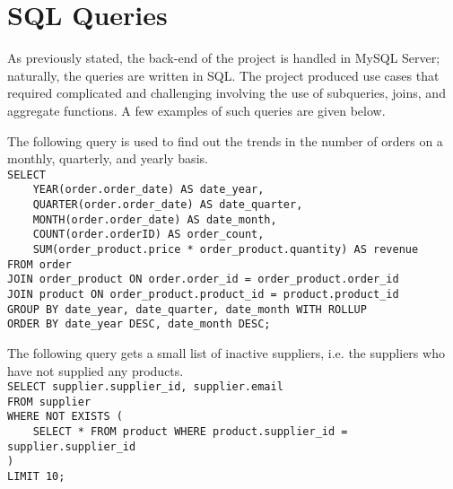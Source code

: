 \section{SQL Queries}

As previously stated, the back-end of the project is handled in MySQL Server; naturally, the queries are written in SQL.
The project produced use cases that required complicated and challenging involving the use of subqueries, joins, and aggregate functions.
A few examples of such queries are given below.

\begin{sqlquery}
The following query is used to find out the trends in the number of orders on a monthly, quarterly, and yearly basis.
\vspace*{5pt} \\
\verb|SELECT                                                           | \\
\verb|    YEAR(order.order_date) AS date_year,                         | \\
\verb|    QUARTER(order.order_date) AS date_quarter,                   | \\
\verb|    MONTH(order.order_date) AS date_month,                       | \\
\verb|    COUNT(order.orderID) AS order_count,                         | \\
\verb|    SUM(order_product.price * order_product.quantity) AS revenue | \\
\verb|FROM order                                                       | \\
\verb|JOIN order_product ON order.order_id = order_product.order_id    | \\
\verb|JOIN product ON order_product.product_id = product.product_id    | \\
\verb|GROUP BY date_year, date_quarter, date_month WITH ROLLUP         | \\
\verb|ORDER BY date_year DESC, date_month DESC;                        |
\end{sqlquery}

\begin{sqlquery}
The following query gets a small list of inactive suppliers, i.e. the suppliers who have not supplied any products.
\vspace*{5pt} \\
\verb|SELECT supplier.supplier_id, supplier.email                                | \\
\verb|FROM supplier                                                              | \\
\verb|WHERE NOT EXISTS (                                                         | \\
\verb|    SELECT * FROM product WHERE product.supplier_id = supplier.supplier_id | \\
\verb|)                                                                          | \\
\verb|LIMIT 10;                                                                  |
\end{sqlquery}


